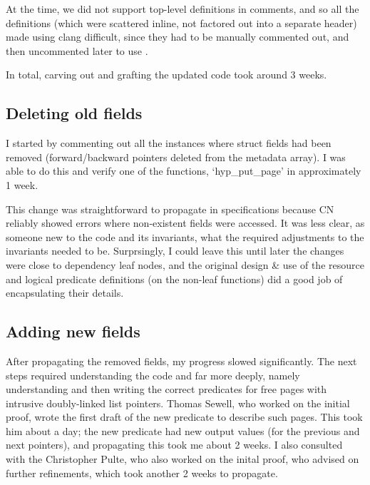 At the time, we did not support top-level  definitions in comments, and
so all the definitions (which were scattered inline, not factored out into a
separate header) made using clang difficult, since they had to be manually
commented out, and then uncommented later to use .

In total, carving out and grafting the updated code took around 3 weeks.

\subsection{Deleting old fields}
I started by commenting out all the instances where struct fields had been
removed (forward/backward pointers deleted from the metadata array). I
was able to do this and verify one of the functions, `hyp\_put\_page'
in approximately 1 week.

This change was straightforward to propagate in specifications because CN
reliably showed errors where non-existent fields were accessed. It was less
clear, as someone new to the code and its invariants, what the required
adjustments to the invariants needed to be. Surprsingly, I could leave this
until later \textemdash{} the changes were close to dependency leaf nodes, and
the original design \& use of the resource and logical predicate definitions
(on the non-leaf functions) did a good job of encapsulating their details.

\subsection{Adding new fields}

After propagating the removed fields, my progress slowed significantly. The
next steps required understanding the code and  far more deeply, namely
understanding \textemdash{} and then writing the correct predicates for
\textemdash{} free pages with intrusive doubly-linked list pointers. Thomas
Sewell, who worked on the initial proof, wrote the first draft of the new
predicate to describe such pages. This took him about a day; the new predicate
had new output values (for the previous and next pointers), and propagating
this took me about 2 weeks. I also consulted with the Christopher Pulte, who
also worked on the inital proof, who advised on further refinements, which took
another 2 weeks to propagate.


